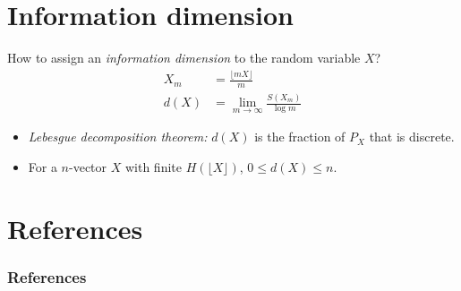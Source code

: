 \documentclass[14pt,c]{beamer}
\begin{document}
\section{Information dimension}

\begin{frame}
  How to assign an \emph{information dimension} to the random variable $X$?
  \begin{align*}
    X_m &= \frac{\lfloor m X \rfloor}{m} \\
    d(X) &= \lim_{m \to \infty} \frac{S(X_m)}{\log m}
  \end{align*}
  \begin{itemize}
    \item \emph{Lebesgue decomposition theorem:} $d(X)$ is the fraction of
      $P_X$ that is discrete.

    \item For a $n$-vector $X$ with finite $H(\lfloor X \rfloor)$, $0 \le d(X)
      \le n$.
  \end{itemize}
\end{frame}

\section{References}

\begin{frame}
  \frametitle<presentation>{References}
  \nocite{*}
  \printbibliography%
\end{frame}
\end{document}
